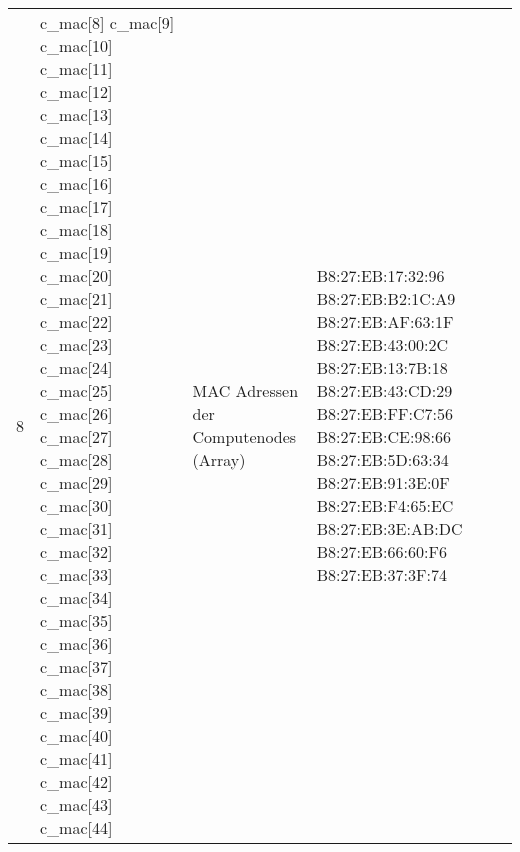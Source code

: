 \begin{longtable}{| p{0.5cm} | p{3cm} | p{8.5cm} | p{4cm} |}
8 & c\_mac[8] \newline c\_mac[9] \newline  c\_mac[10] \newline c\_mac[11] \newline c\_mac[12] \newline c\_mac[13] \newline c\_mac[14] \newline c\_mac[15] \newline c\_mac[16] \newline c\_mac[17] \newline c\_mac[18] \newline c\_mac[19] \newline c\_mac[20] \newline c\_mac[21] \newline c\_mac[22] \newline c\_mac[23] \newline c\_mac[24] \newline c\_mac[25] \newline c\_mac[26] \newline c\_mac[27] \newline c\_mac[28] \newline c\_mac[29] \newline c\_mac[30] \newline c\_mac[31] \newline c\_mac[32] \newline c\_mac[33] \newline c\_mac[34] \newline c\_mac[35] \newline c\_mac[36] \newline c\_mac[37] \newline c\_mac[38] \newline c\_mac[39] \newline c\_mac[40] \newline c\_mac[41] \newline c\_mac[42] \newline c\_mac[43] \newline c\_mac[44] & MAC Adressen der Computenodes (Array) & B8:27:EB:17:32:96 \newline B8:27:EB:B2:1C:A9 \newline B8:27:EB:AF:63:1F \newline B8:27:EB:43:00:2C \newline B8:27:EB:13:7B:18 \newline B8:27:EB:43:CD:29 \newline B8:27:EB:FF:C7:56 \newline B8:27:EB:CE:98:66 \newline B8:27:EB:5D:63:34 \newline B8:27:EB:91:3E:0F \newline B8:27:EB:F4:65:EC \newline B8:27:EB:3E:AB:DC \newline B8:27:EB:66:60:F6 \newline B8:27:EB:37:3F:74 
\end{longtable}
